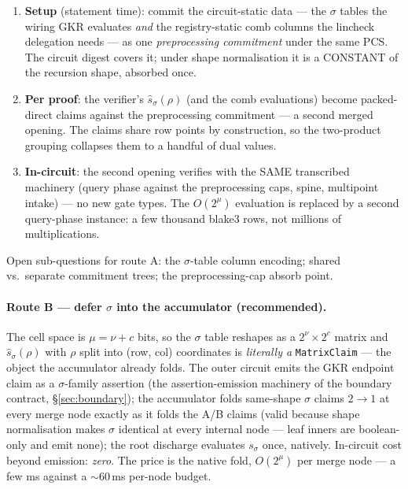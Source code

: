 \documentclass[11pt]{article}
\newcommand{\code}[1]{\texttt{#1}}
\theoremstyle{definition}
\begin{document}
\begin{enumerate}[nosep]
  \item \textbf{Setup} (statement time): commit the circuit-static data
        --- the $\sigma$ tables the wiring GKR evaluates \emph{and} the
        registry-static comb columns the lincheck delegation needs --- as
        one \emph{preprocessing commitment} under the same PCS. The
        circuit digest covers it; under shape normalisation it is a
        CONSTANT of the recursion shape, absorbed once.
  \item \textbf{Per proof}: the verifier's $\hat s_\sigma(\rho)$ (and the
        comb evaluations) become packed-direct claims against the
        preprocessing commitment --- a second merged opening. The claims
        share row points by construction, so the two-product grouping
        collapses them to a handful of dual values.
  \item \textbf{In-circuit}: the second opening verifies with the SAME
        transcribed machinery (query phase against the preprocessing
        caps, spine, multipoint intake) --- no new gate types. The
        $O(2^\mu)$ evaluation is replaced by a second query-phase
        instance: a few thousand blake3 rows, not millions of
        multiplications.
\end{enumerate}

Open sub-questions for route A: the $\sigma$-table column encoding;
shared vs.\ separate commitment trees; the preprocessing-cap absorb
point.

\paragraph{Route B --- defer $\sigma$ into the accumulator
(recommended).} The cell space is $\mu = \nu + c$ bits, so the
$\sigma$ table reshapes as a $2^{\nu} \times 2^{c}$ matrix and
$\hat s_\sigma(\rho)$ with $\rho$ split into (row, col) coordinates is
\emph{literally a} \code{MatrixClaim} --- the object the accumulator
already folds. The outer circuit emits the GKR endpoint claim as a
$\sigma$-family assertion (the assertion-emission machinery of the
boundary contract, \S\ref{sec:boundary}); the accumulator folds
same-shape $\sigma$ claims $2 \to 1$ at every merge node exactly as it
folds the A/B claims (valid because shape normalisation makes $\sigma$
identical at every internal node --- leaf inners are boolean-only and
emit none); the root discharge evaluates $s_\sigma$ once, natively.
In-circuit cost beyond emission: \emph{zero}. The price is the native
fold, $O(2^{\mu})$ per merge node --- a few ms against a $\sim$60\,ms
per-node budget.
\end{document}

